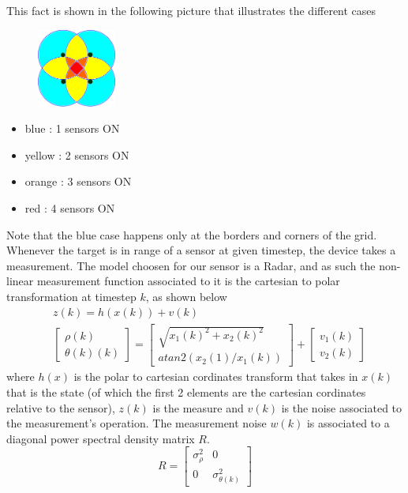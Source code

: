 \documentclass[twocolumn]{article}
\begin{document}
This fact is shown in the following picture that illustrates the different cases
\begin{figure}[h!]
    \centering
    \includegraphics[width=0.23\textwidth]{Immagini/4sensor.png}
    \caption{}
    \label{fig:number}
\end{figure}
\begin{itemize}
    \item blue : 1 sensors ON
    \item yellow : 2 sensors ON
    \item orange : 3 sensors ON
    \item red : 4 sensors ON
\end{itemize}
Note that the blue case happens only at the borders and corners of the grid.
\\
Whenever the target is in range of a sensor at given timestep, the device takes a measurement.
The model choosen for our sensor is a Radar, and as such the non-linear measurement function
associated to it is the cartesian to polar transformation at timestep $k$, as shown below
\begin{align*}
     & z(k)=h(x(k))+v(k)          \\
     & \begin{bmatrix}
        \rho(k) \\ \theta (k)(k)
    \end{bmatrix}=
    \begin{bmatrix}
        \sqrt{x_{1}(k)^2+x_{2}(k)^2} \\ atan2(x_{2}(1)/x_{1}(k))
    \end{bmatrix} +
    \begin{bmatrix}
        v_{1}(k) \\v_{2}(k)
    \end{bmatrix}
\end{align*}
where $h(x)$ is the polar to cartesian cordinates transform that takes in $x(k)$ that is the state (of which the first 2 elements are the cartesian
cordinates relative to the sensor), $z(k)$ is the measure and $v(k)$ is the noise associated to the measurement's operation. The measurement noise $w(k)$ is associated
to a diagonal power spectral density matrix $R$.
\begin{equation*}
    R=\begin{bmatrix}
        \sigma^{2}_{\rho} & 0                       \\
        0                 & \sigma^{2}_{\theta (k)}
    \end{bmatrix}
\end{equation*}
\end{document}
